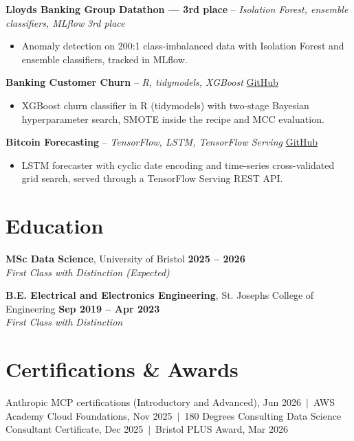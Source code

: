 \documentclass[a4paper,11pt]{article}
\begin{document}
\vspace{3pt}
\noindent\textbf{Lloyd\textquotesingle{}s Banking Group Datathon — 3rd place} -- \textit{Isolation Forest, ensemble classifiers, MLflow} \hfill \textit{3rd place}
\begin{itemize}
  \item Anomaly detection on 200:1 class-imbalanced data with Isolation Forest and ensemble classifiers, tracked in MLflow.
\end{itemize}
\vspace{3pt}
\noindent\textbf{Banking Customer Churn} -- \textit{R, tidymodels, XGBoost} \hfill \href{https://github.com/Thiruvel-AP/Banking-Customer-Churn-Prediction}{GitHub}
\begin{itemize}
  \item XGBoost churn classifier in R (tidymodels) with two-stage Bayesian hyperparameter search, SMOTE inside the recipe and MCC evaluation.
\end{itemize}
\vspace{3pt}
\noindent\textbf{Bitcoin Forecasting} -- \textit{TensorFlow, LSTM, TensorFlow Serving} \hfill \href{https://github.com/Thiruvel-AP/BitcoinForecasting}{GitHub}
\begin{itemize}
  \item LSTM forecaster with cyclic date encoding and time-series cross-validated grid search, served through a TensorFlow Serving REST API.
\end{itemize}

\section{Education}
\textbf{MSc Data Science}, University of Bristol \hfill \textbf{2025 – 2026}\\ \textit{First Class with Distinction (Expected)}\par
\vspace{3pt}
\textbf{B.E. Electrical and Electronics Engineering}, St. Joseph\textquotesingle{}s College of Engineering \hfill \textbf{Sep 2019 – Apr 2023}\\ \textit{First Class with Distinction}\par

\section{Certifications \& Awards}
Anthropic MCP certifications (Introductory and Advanced), Jun 2026 \,$|$\, AWS Academy Cloud Foundations, Nov 2025 \,$|$\, 180 Degrees Consulting Data Science Consultant Certificate, Dec 2025 \,$|$\, Bristol PLUS Award, Mar 2026
\end{document}

